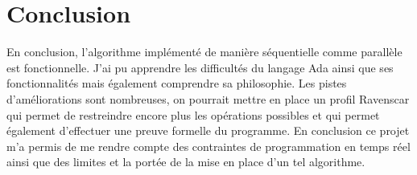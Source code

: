 \documentclass[a4paper]{article}
\begin{document}
\section{Conclusion}
En conclusion, l'algorithme implémenté de manière séquentielle comme parallèle est fonctionnelle. J'ai pu apprendre les difficultés du langage Ada ainsi que ses fonctionnalités mais également comprendre sa philosophie. Les pistes d'améliorations sont nombreuses, on pourrait mettre en place un profil Ravenscar qui permet de restreindre encore plus les opérations possibles et qui permet également d'effectuer une preuve formelle du programme.
\smallbreak
En conclusion ce projet m'a permis de me rendre compte des contraintes de programmation en temps réel ainsi que des limites et la portée de la mise en place d'un tel algorithme.
\end{document}
